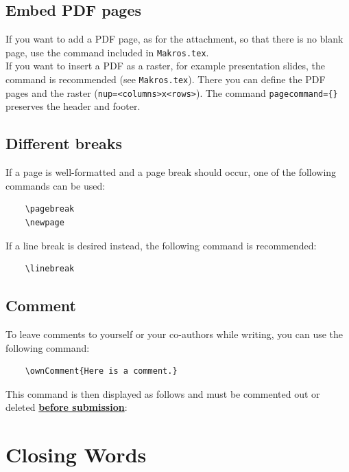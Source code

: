 \subsection{Embed PDF pages}

If you want to add a PDF page, as for the attachment, so that there is no blank page, use the command included in \verb|Makros.tex|.\\

If you want to insert a PDF as a raster, for example presentation slides, the command \verb|| is recommended (see \verb|Makros.tex|). There you can define the PDF pages and the raster (\verb|nup=<columns>x<rows>|). The command \verb|pagecommand={}| preserves the header and footer.


\subsection{Different breaks}

If a page is well-formatted and a page break should occur, one of the following commands can be used:

\begin{verbatim}
    \pagebreak
    \newpage
\end{verbatim}

If a line break is desired instead, the following command is recommended:

\begin{verbatim}
    \linebreak
\end{verbatim}


\subsection{Comment}

To leave comments to yourself or your co-authors while writing, you can use the following command:

\begin{verbatim}
    \ownComment{Here is a comment.}
\end{verbatim}

This command is then displayed as follows and must be commented out or deleted \textbf{\underline{before submission}}:



\vfill
\section{Closing Words}


